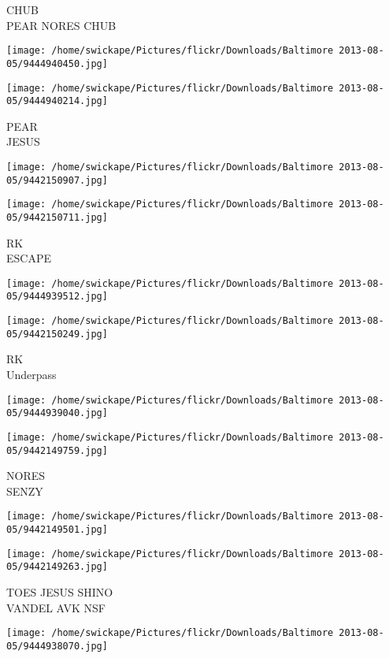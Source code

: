 \documentclass[10pt,letterpaper]{article}
\begin{document}
CHUB\\
PEAR NORES CHUB
\pagebreak

\texttt{[image: /home/swickape/Pictures/flickr/Downloads/Baltimore 2013-08-05/9444940450.jpg]}

\vspace{0.25in}
\texttt{[image: /home/swickape/Pictures/flickr/Downloads/Baltimore 2013-08-05/9444940214.jpg]}

PEAR\\
JESUS
\pagebreak

\texttt{[image: /home/swickape/Pictures/flickr/Downloads/Baltimore 2013-08-05/9442150907.jpg]}

\vspace{0.25in}
\texttt{[image: /home/swickape/Pictures/flickr/Downloads/Baltimore 2013-08-05/9442150711.jpg]}

RK\\
ESCAPE
\pagebreak

\texttt{[image: /home/swickape/Pictures/flickr/Downloads/Baltimore 2013-08-05/9444939512.jpg]}

\vspace{0.25in}
\texttt{[image: /home/swickape/Pictures/flickr/Downloads/Baltimore 2013-08-05/9442150249.jpg]}

RK\\
Underpass
\pagebreak

\texttt{[image: /home/swickape/Pictures/flickr/Downloads/Baltimore 2013-08-05/9444939040.jpg]}

\vspace{0.25in}
\texttt{[image: /home/swickape/Pictures/flickr/Downloads/Baltimore 2013-08-05/9442149759.jpg]}

NORES\\
SENZY
\pagebreak

\texttt{[image: /home/swickape/Pictures/flickr/Downloads/Baltimore 2013-08-05/9442149501.jpg]}

\vspace{0.25in}
\texttt{[image: /home/swickape/Pictures/flickr/Downloads/Baltimore 2013-08-05/9442149263.jpg]}

TOES JESUS SHINO\\
VANDEL AVK NSF
\pagebreak

\texttt{[image: /home/swickape/Pictures/flickr/Downloads/Baltimore 2013-08-05/9444938070.jpg]}
\end{document}
